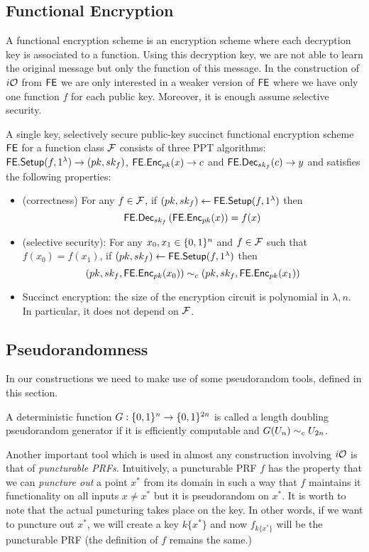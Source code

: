 \subsection{Functional Encryption}
A functional encryption scheme is an encryption scheme where each decryption key is associated to a function. Using this decryption key, we are not able to learn the original message but only the function of this message. In the construction of $i\mathcal{O}$ from $\mathsf{FE}$ we are only interested in a weaker version of $\mathsf{FE}$ where we have only one function $f$ for each public key. Moreover, it is enough assume selective security.
\begin{mydef}
A single key, selectively secure public-key succinct functional encryption scheme $\mathsf{FE}$ for a function class $\mathcal{F}$ consists of three PPT algorithms: $\mathsf{FE.Setup}(f,1^\lambda)\to(pk,sk_f)$, $\mathsf{FE.Enc}_{pk}(x)\to c$ and $\mathsf{FE.Dec}_{sk_f}(c) \to y$ and satisfies the following properties:
\begin{itemize}
\item (correctness) For any $f\in\mathcal{F}$, if $(pk,sk_f)\gets\mathsf{FE.Setup}(f,1^\lambda)$ then
\[
\mathsf{FE.Dec}_{sk_f}\left(\mathsf{FE.Enc}_{pk}(x)\right)=f(x)
\]
\item (selective security): For any $x_0,x_1\in\{0,1\}^n$ and $f\in\mathcal{F}$ such that $f(x_0)=f(x_1)$, if $(pk,sk_f)\gets\mathsf{FE.Setup}(f,1^\lambda)$ then
\[
\left(pk,sk_f,\mathsf{FE.Enc}_{pk}(x_0)\right)\sim_c \left(pk,sk_f,\mathsf{FE.Enc}_{pk}(x_1)\right)
\]
\item Succinct encryption: the size of the encryption circuit is polynomial in $\lambda,n$. In particular, it does not depend on $\mathcal{F}$.
\end{itemize}
\end{mydef}


\subsection{Pseudorandomness}

In our constructions we need to make use of some pseudorandom tools, defined in this section. 

\begin{mydef}[PRG]
A deterministic function $G:\{0,1\}^n\to\{0,1\}^{2n}$ is called a length doubling pseudorandom generator if it is efficiently computable and $G(U_n)\sim_c U_{2n}$.
\end{mydef}

Another important tool which is used in almost any construction involving $i\mathcal{O}$ is that of \emph{puncturable PRFs}. Intuitively, a puncturable PRF $f$ has the property that we can \emph{puncture out} a point $x^*$ from its domain in such a way that $f$ maintains it functionality on all inputs $x\ne x^*$ but it is pseudorandom on $x^*$. It is worth to note that the actual puncturing takes place on the key. In other words, if we want to puncture out $x^*$, we will create a key $k\{x^*\}$ and now $f_{k\{x^*\}}$ will be the puncturable PRF (the definition of $f$ remains the same.)

